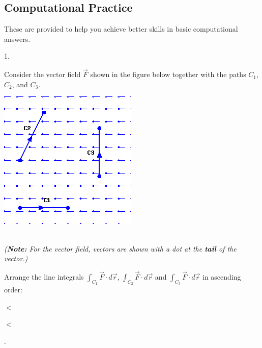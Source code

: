 \documentclass[10pt,]{book}
\theoremstyle{plain}
\theoremstyle{definition}
\theoremstyle{definition}
\theoremstyle{definition}
\theoremstyle{definition}
\theoremstyle{definition}
\numberwithin{equation}{section}
\begin{document}
\subsection[{Computational Practice}]{Computational Practice}\label{exercises-18}
These are provided to help you achieve better skills in basic computational answers.%
\begin{exerciselist}
\item[1.]\hypertarget{exercise-78}{}\mbox{}\\ %
\begin{mdframed}
{
Consider the vector field \(\vec{F}\) shown in the figure below
together with the paths \(C_1\), \(C_2\), and \(C_3\).
\par 
\begin{center} 
\includegraphics[width=0.25\linewidth]{webwork-tex/webwork-78-image-1.png}

\leavevmode\\\relax 
{\it ({\bf Note:} For the vector field, vectors are shown with a
dot at the {\bf tail} of the vector.)} 
\end{center} 
\par 
Arrange the line integrals \(\int_{C_1} \vec{F} \cdot d\vec{r}\),
\(\int_{C_2} \vec{F} \cdot d\vec{r}\) and
\(\int_{C_3} \vec{F} \cdot d\vec{r}\) in ascending
order:
\par 

\par{}
 \(<\)

\par{}
 \(<\)

\par{}
.




}
\end{mdframed}
\end{exerciselist}
\end{document}
